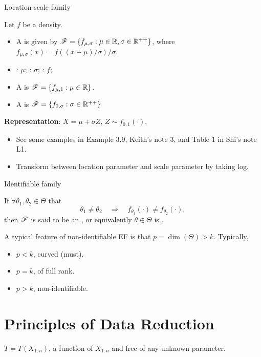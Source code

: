 \documentclass[10pt,a4paper]{book}
\begin{document}
\begin{defbox}{Location-scale family}
	\begin{definition}\label{def:ls-family}
		Let $f$ be a density. 
		\begin{itemize}
			\item A  is given by $\mathscr{F}=\{f_{\mu,\sigma}:\mu \in\mathbb R, \sigma\in\mathbb R^{++}\}$, where $f_{\mu,\sigma}(x)= f\left({(x-\mu)}/\sigma\right)/\sigma$.
			\item {}: $\mu$; : $\sigma$; : $f$;
			\item A  is $\mathscr{F}=\{f_{\mu,1}:\mu\in\mathbb R\}$.
			\item A  is $\mathscr{F}=\{f_{0,\sigma}:\sigma\in\mathbb R^{++}\}$ 
		\end{itemize}
	\end{definition}
\end{defbox}
\textbf{Representation}: $X=\mu + \sigma Z$, $Z\sim f_{0,1}(\cdot)$. 
\begin{itemize}
	\item See some examples in Example 3.9, Keith's note 3, and Table 1 in Shi's note L1. 
	\item Transform between location parameter and scale parameter by taking log.
\end{itemize}


\begin{defbox}{Identifiable family}
	\begin{definition}\label{def:id-family}
		If $\forall \theta_1,\theta_2\in\Theta$ that    
		\begin{equation*}
			\theta_1\neq\theta_2\quad\Rightarrow\quad f_{\theta_1}(\cdot)\neq f_{\theta_2}(\cdot),
		\end{equation*}
		then $\mathscr{F}$ is said to be an , or equivalently $\theta\in\Theta$ is . 
	\end{definition}
\end{defbox}

A typical feature of non-identifiable EF is that $p=\dim(\Theta)>k$. Typically,
\begin{itemize}
	\item $p<k$, curved (must).
	\item $p=k$, of full rank.
	\item $p>k$, non-identifiable.  
\end{itemize} 

\section{Principles of Data Reduction}\label{sec:prin-data-reduce}
 $T=T(X_{1:n})$, a function of $X_{1:n}$ and free of any unknown parameter.  
\end{document}

